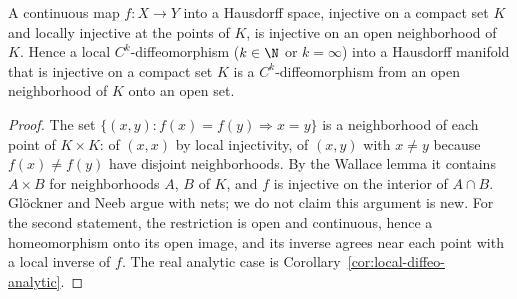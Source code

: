 \begin{proposition}
  \label{prop:local-diffeo-compact}
  \leanok
  A continuous map $f \colon X \to Y$ into a Hausdorff space, injective on a compact set $K$ and
  locally injective at the points of $K$, is injective on an open neighborhood of $K$. Hence a
  local $C^k$-diffeomorphism ($k \in \N$ or $k = \infty$) into a Hausdorff manifold that is
  injective on a compact set $K$ is a $C^k$-diffeomorphism from an open neighborhood of $K$ onto
  an open set.
\end{proposition}

\begin{proof}
  \leanok
  The set $\{(x, y) : f(x) = f(y) \Rightarrow x = y\}$ is a neighborhood of each point of
  $K \times K$: of $(x, x)$ by local injectivity, of $(x, y)$ with $x \ne y$ because
  $f(x) \ne f(y)$ have disjoint neighborhoods. By the Wallace lemma it contains $A \times B$ for
  neighborhoods $A$, $B$ of $K$, and $f$ is injective on the interior of $A \cap B$. Glöckner and
  Neeb argue with nets; we do not claim this argument is new. For the second statement, the
  restriction is open and continuous, hence a homeomorphism onto its open image, and its inverse
  agrees near each point with a local inverse of $f$. The real analytic case is
  Corollary~\ref{cor:local-diffeo-analytic}.
\end{proof}

